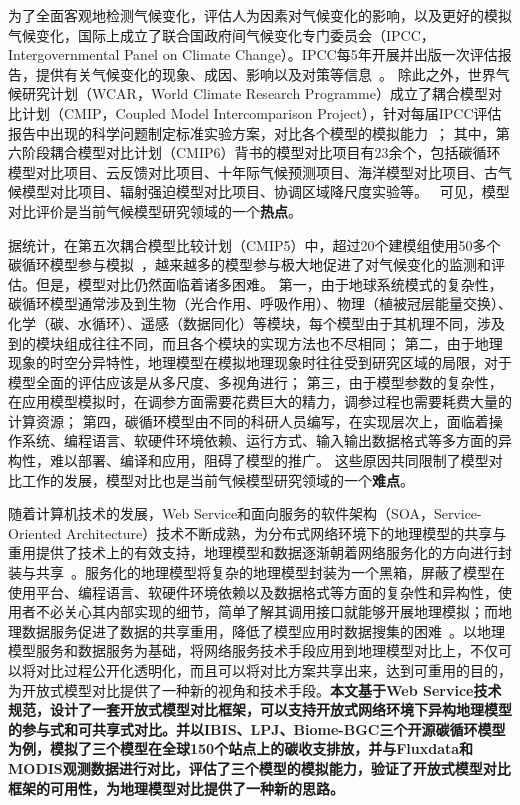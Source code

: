 为了全面客观地检测气候变化，评估人为因素对气候变化的影响，以及更好的模拟气候变化，国际上成立了联合国政府间气候变化专门委员会（IPCC，Intergovernmental Panel on Climate Change）。IPCC每5年开展并出版一次评估报告，提供有关气候变化的现象、成因、影响以及对策等信息~\cite{Oliver2013Intergovernmental}。
除此之外，世界气候研究计划（WCAR，World Climate Research Programme）成立了耦合模型对比计划（CMIP，Coupled Model Intercomparison Project），针对每届IPCC评估报告中出现的科学问题制定标准实验方案，对比各个模型的模拟能力~\cite{meehl2000coupled}；
其中，第六阶段耦合模型对比计划（CMIP6）背书的模型对比项目有23余个，包括碳循环模型对比项目、云反馈对比项目、十年际气候预测项目、海洋模型对比项目、古气候模型对比项目、辐射强迫模型对比项目、协调区域降尺度实验等。~\cite{WCRP-CMIP6-Endorsed-CMIPs}
可见，模型对比评价是当前气候模型研究领域的一个\textbf{热点}。


据统计，在第五次耦合模型比较计划（CMIP5）中，超过20个建模组使用50多个碳循环模型参与模拟~\cite{Taylor2012An}，越来越多的模型参与极大地促进了对气候变化的监测和评估。但是，模型对比仍然面临着诸多困难。
第一，由于地球系统模式的复杂性，碳循环模型通常涉及到生物（光合作用、呼吸作用）、物理（植被冠层能量交换）、化学（碳、水循环）、遥感（数据同化）等模块，每个模型由于其机理不同，涉及到的模块组成往往不同，而且各个模块的实现方法也不尽相同；
第二，由于地理现象的时空分异特性，地理模型在模拟地理现象时往往受到研究区域的局限，对于模型全面的评估应该是从多尺度、多视角进行；
第三，由于模型参数的复杂性，在应用模型模拟时，在调参方面需要花费巨大的精力，调参过程也需要耗费大量的计算资源；
第四，碳循环模型由不同的科研人员编写，在实现层次上，面临着操作系统、编程语言、软硬件环境依赖、运行方式、输入输出数据格式等多方面的异构性，难以部署、编译和应用，阻碍了模型的推广。
这些原因共同限制了模型对比工作的发展，模型对比也是当前气候模型研究领域的一个\textbf{难点}。

随着计算机技术的发展，Web Service和面向服务的软件架构（SOA，Service-Oriented Architecture）技术不断成熟，为分布式网络环境下的地理模型的共享与重用提供了技术上的有效支持，地理模型和数据逐渐朝着网络服务化的方向进行封装与共享~\cite{胡迪2015地理模型的服务化封装方法研究}。服务化的地理模型将复杂的地理模型封装为一个黑箱，屏蔽了模型在使用平台、编程语言、软硬件环境依赖以及数据格式等方面的复杂性和异构性，使用者不必关心其内部实现的细节，简单了解其调用接口就能够开展地理模拟；而地理数据服务促进了数据的共享重用，降低了模型应用时数据搜集的困难~\cite{Yue2015A}。以地理模型服务和数据服务为基础，将网络服务技术手段应用到地理模型对比上，不仅可以将对比过程公开化透明化，而且可以将对比方案共享出来，达到可重用的目的，为开放式模型对比提供了一种新的视角和技术手段。\textbf{本文基于Web Service技术规范，设计了一套开放式模型对比框架，可以支持开放式网络环境下异构地理模型的参与式和可共享式对比。并以IBIS、LPJ、Biome-BGC三个开源碳循环模型为例，模拟了三个模型在全球150个站点上的碳收支排放，并与Fluxdata和MODIS观测数据进行对比，评估了三个模型的模拟能力，验证了开放式模型对比框架的可用性，为地理模型对比提供了一种新的思路。}


